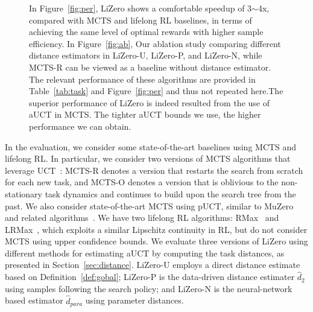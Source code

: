 \begin{figure*}[h]
\centering
    \hfill
  \hfill
  \vspace{-0.15in}
  \caption{
  In Figure~\ref{fig:per}, LiZero shows a comfortable speedup of 3$\sim$4x, compared with MCTS and lifelong RL baselines, in terms of achieving the same level of optimal rewards with higher sample efficiency. In Figure~\ref{fig:ab}, Our ablation study comparing different distance estimators in LiZero-U, LiZero-P, and LiZero-N, while MCTS-R can be viewed as a baseline without distance estimator. The relevant performance of these algorithms are provided in Table~\ref{tab:task} and Figure~\ref{fig:per} and thus not repeated here.The superior performance of LiZero is indeed resulted from the use of aUCT in MCTS. The tighter aUCT bounds we use, the higher performance we can obtain.
  }
\end{figure*}




In the evaluation, we consider some state-of-the-art baselines using MCTS and lifelong RL. In particular, we consider two versions of MCTS algorithms that leverage  UCT~\cite{winands2024monte,kocsis2006bandit,chengspeculative}: MCTS-R denotes a version that restarts the search from scratch for each new task, and MCTS-O denotes a version that is oblivious to the non-stationary task dynamics and continues to build upon the search tree from the past. We also consider state-of-the-art MCTS using pUCT, similar to MuZero and related algorithms~\cite{Schrittwieser_2020}. We have two lifelong RL algorithms: RMax~\cite{brafman2002r} and LRMax~\cite{lecarpentier2021lipschitz}, which exploits a similar Lipschitz continuity in RL, but do not consider MCTS using upper confidence bounds. We evaluate three versions of LiZero using different methods for estimating aUCT by computing the task distances, as presented in Section~\ref{sec:distance}. LiZero-U employs a direct distance estimate based on Definition~\ref{def:gobal}; LiZero-P is the data-driven distance estimater $\hat{d}_2$ using samples following the search policy; and LiZero-N is the neural-network based estimator $\hat{d}_{para}$  using parameter distances. 








